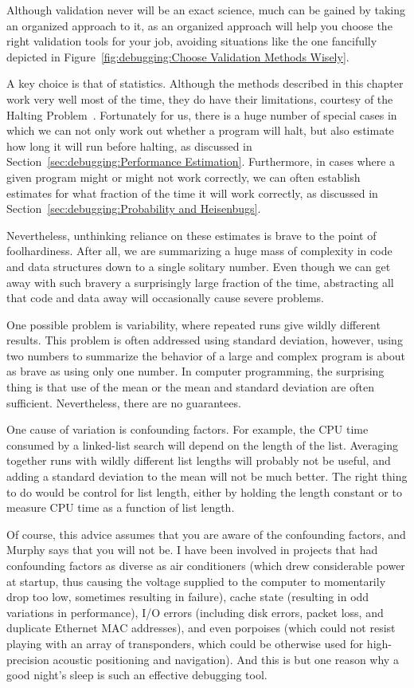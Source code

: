 Although validation never will be an exact science, much can be gained
by taking an organized approach to it, as an organized approach will
help you choose the right validation tools for your job, avoiding
situations like the one fancifully depicted in
Figure~\ref{fig:debugging:Choose Validation Methods Wisely}.

A key choice is that of statistics.
Although the methods described in this chapter work very well most of
the time, they do have their limitations, courtesy of the Halting
Problem~\cite{AlanMTuring1937HaltingProblem,GeoffreyKPullum2000HaltingProblem}.
Fortunately for us, there is a huge number of special cases in which
we can not only work out whether a program will halt, but also
estimate how long it will run before halting, as discussed in
Section~\ref{sec:debugging:Performance Estimation}.
Furthermore, in cases where a given program might or might not work
correctly, we can often establish estimates for what fraction of the
time it will work correctly, as discussed in
Section~\ref{sec:debugging:Probability and Heisenbugs}.

Nevertheless, unthinking reliance on these estimates is brave to the
point of foolhardiness.
After all, we are summarizing a huge mass of complexity in code and
data structures down to a single solitary number.
Even though we can get away with such bravery a surprisingly large
fraction of the time, abstracting all that code and data away will
occasionally cause severe problems.

One possible problem is variability, where repeated runs give wildly
different results.
This problem is often addressed using standard deviation, however, using
two numbers to summarize the behavior of a large and complex program is
about as brave as using only one number.
In computer programming, the surprising thing is that use of the
mean or the mean and standard deviation are often sufficient.
Nevertheless, there are no guarantees.

One cause of variation is confounding factors.
For example, the CPU time consumed by a linked-list search will depend
on the length of the list.
Averaging together runs with wildly different list lengths will
probably not be useful, and adding a standard deviation to the mean
will not be much better.
The right thing to do would be control for list length, either by
holding the length constant or to measure CPU time as a function of
list length.

Of course, this advice assumes that you are aware of the confounding
factors, and Murphy says that you will not be.
I have been involved in projects that had confounding factors as diverse
as air conditioners (which drew considerable power at startup, thus
causing the voltage supplied to the computer to momentarily drop too
low, sometimes resulting in failure), cache state (resulting in odd
variations in performance), I/O errors (including disk errors, packet
loss, and duplicate Ethernet MAC addresses), and even porpoises (which
could not resist playing with an array of transponders, which could be
otherwise used for high-precision acoustic positioning and navigation).
And this is but one reason why a good night's sleep is such an effective
debugging tool.

